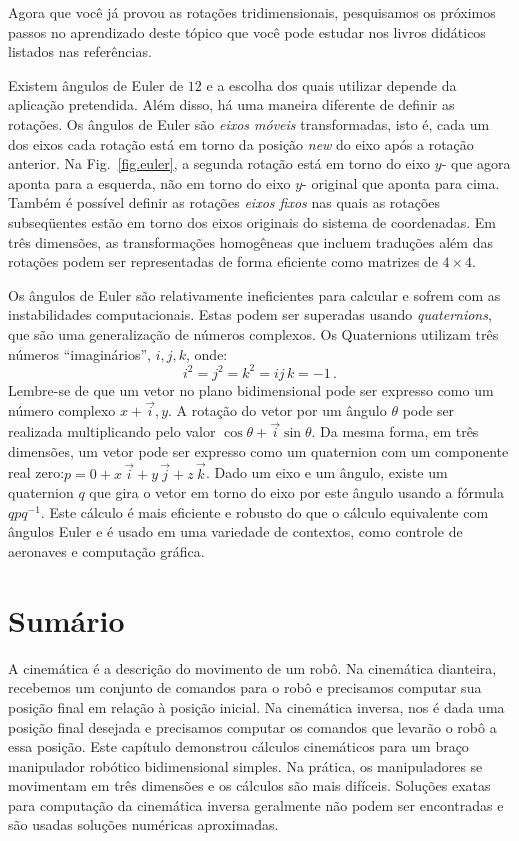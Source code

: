 Agora que você já provou as rotações tridimensionais, pesquisamos os próximos passos no aprendizado deste tópico que você pode estudar nos livros didáticos listados nas referências.

Existem ângulos de Euler de $12$ e a escolha dos quais utilizar depende da aplicação pretendida. Além disso, há uma maneira diferente de definir as rotações. Os ângulos de Euler são \emph{eixos móveis} transformadas, isto é, cada um dos eixos  cada rotação está em torno da posição \emph{new} do eixo após a rotação anterior. Na Fig.~\ref{fig.euler}, a segunda rotação está em torno do eixo $y$- que agora aponta para a esquerda, não em torno do eixo $y$- original que aponta para cima. Também é possível definir as rotações \emph{eixos fixos} nas quais as rotações subseqüentes estão em torno dos eixos originais do sistema de coordenadas. Em três dimensões, as transformações homogêneas que incluem traduções além das rotações podem ser representadas de forma eficiente como matrizes de $4\times 4$.

Os ângulos de Euler são relativamente ineficientes para calcular e sofrem com as instabilidades computacionais. Estas podem ser superadas usando \emph{quaternions}, que são uma generalização de números complexos. Os Quaternions utilizam três números ``imaginários'', $i,j,k$, onde:
\[
i^2 = j^2 = k^2 = ij\,k = -1\,.
\]
Lembre-se de que um vetor no plano bidimensional pode ser expresso como um número complexo $x+\vec{i},y$. A rotação do vetor por um ângulo $\theta$ pode ser realizada multiplicando pelo valor $\cos \theta + \vec{i} \sin\theta$.  Da mesma forma, em três dimensões, um vetor pode ser expresso como um quaternion com um componente real zero:$p=0+x\,\vec{i} + y\,\vec{j} + z\,\vec{k}$. Dado um eixo e um ângulo, existe um quaternion $q$ que gira o vetor em torno do eixo por este ângulo usando a fórmula $qpq^{-1}$. Este cálculo é mais eficiente e robusto do que o cálculo equivalente com ângulos Euler e é usado em uma variedade de contextos, como controle de aeronaves e computação gráfica.


\section{Sumário}

A cinemática é a descrição do movimento de um robô. Na cinemática dianteira, recebemos um conjunto de comandos para o robô e precisamos computar sua posição final em relação à posição inicial. Na cinemática inversa, nos é dada uma posição final desejada e precisamos computar os comandos que levarão o robô a essa posição. Este capítulo demonstrou cálculos cinemáticos para um braço manipulador robótico bidimensional simples. Na prática, os manipuladores se movimentam em três dimensões e os cálculos são mais difíceis. Soluções exatas para computação da cinemática inversa geralmente não podem ser encontradas e são usadas soluções numéricas aproximadas.

